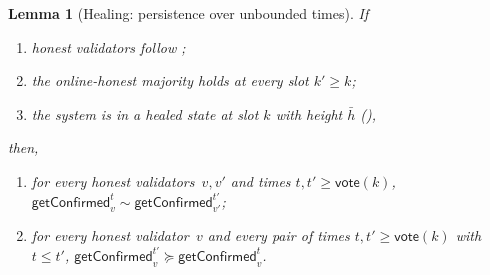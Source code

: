 \documentclass{article}
\newcommand{\vote}{\mathsf{vote}}
\newcommand{\comm}[1]{\bar{#1}}
\newcommand{\getConfirmed}{\textsf{getConfirmed}\xspace}
\theoremstyle{plain}
\newtheorem{lemma}{Lemma}
\theoremstyle{definition}
\theoremstyle{remark}
\newcommand{\OHM}{online-honest majority\xspace}
\begin{document}
\begin{lemma}[Healing: persistence over unbounded times]\label{rev:lem:healing-unbounded}
If
\begin{enumerate}
  \item honest validators follow ;
  \item the \OHM holds at every slot $k' \geq k$;
  \item the system is in a healed state at slot $k$ with height $\comm{h}$ (),
\end{enumerate}
then,
\begin{enumerate}
  \item for every honest validators~$v,v'$ and times $t, t' \geq \vote(k)$, $\getConfirmed_v^{t} \sim \getConfirmed_{v'}^{t'}$;
  \item for every honest validator~$v$ and every pair of times $t, t' \geq \vote(k)$ with $t \leq t'$, $\getConfirmed_v^{t'} \succeq \getConfirmed_v^t$.
\end{enumerate}
\end{lemma}
\end{document}
